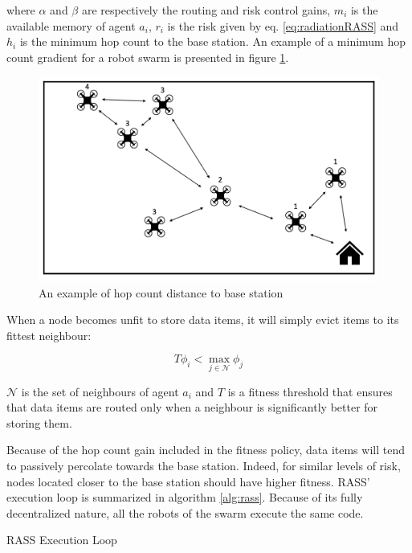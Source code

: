 where $\alpha$ and $\beta$ are respectively the routing and risk control gains, $m_i$ is the available memory of agent $a_i$,  $r_i$ is the risk given by eq. \ref{eq:radiationRASS} and $h_i$ is the minimum hop count to the base station. An example of a minimum hop count gradient for a robot swarm is presented in figure \ref{hop_count_rass}. 

\begin{figure}[H]
	\centering
    \includegraphics[width=0.99\columnwidth]{images/hop_count.png}
    \caption{An example of hop count distance to base station}
    \label{hop_count_rass}
\end{figure}

When a node becomes unfit to store data items, it will simply evict items to its fittest neighbour:

\begin{equation}
    T\phi_i < \max_{j \in \mathcal{N}} \phi_j
\end{equation}

$\mathcal{N}$ is the set of neighbours of agent $a_i$ and $T$ is a fitness threshold that ensures that data items are routed only when a neighbour is significantly better for storing them. 

Because of the hop count gain included in the fitness policy, data items will tend to passively percolate towards the base station. Indeed, for similar levels of risk, nodes located closer to the base station should have higher fitness. RASS' execution loop is summarized in algorithm \ref{alg:rass}. Because of its fully decentralized nature, all the robots of the swarm execute the same code.

\begin{algorithm}[H]
\small
\SetAlgoLined
\DontPrintSemicolon
 \caption{RASS Execution Loop}
 \label{alg:rass}
\end{algorithm}

